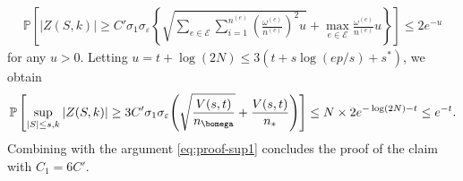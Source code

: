 \documentclass[10pt]{article}
\numberwithin{equation}{section}
\begin{document}
\begin{align*}
    \mathbb{P}\left[ |Z(S,k)| \ge C' \sigma_1 \sigma_\varepsilon \left\{\sqrt{\sum_{e\in \mathcal{E}} \sum_{i=1}^{n^{(e)}}  \left(\frac{\omega^{(e)}}{n^{(e)}}\right)^2 u} + \max_{e\in \mathcal{E}} \frac{\omega^{(e)}}{n^{(e)}} u\right\}\right] \le 2e^{-u}
\end{align*} for any $u>0$. Letting $u=t+\log(2N) \le 3 \left(t + s\log(ep/s) + s^*\right)$, we obtain
\begin{align*}
    \mathbb{P}\left[\sup_{|S|\le s, k} |Z(S,k)| \ge 3C' \sigma_1\sigma_\varepsilon \Bigg(\sqrt{\frac{V(s,t)}{n_{\bomega}}} + \frac{V(s,t)}{n_*}\Bigg)\right] \le  N\times 2e^{-\log(2N)-t} \le e^{-t}.
\end{align*} Combining with the argument \eqref{eq:proof-sup1} concludes the proof of the claim with $C_1=6C'$.
\end{document}
